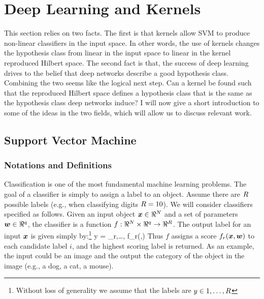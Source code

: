 \section{Deep Learning and Kernels}
This section relies on two facts.
The first is that kernels allow SVM to produce non-linear classifiers in the input space.
In other words, the use of kernels changes the hypothesis class from linear in the input space to linear in the kernel reproduced Hilbert space.
The second fact is that, the success of deep learning drives to the belief that deep networks describe a good hypothesis class.
Combining the two seems like the logical next step.
Can a kernel be found such that the reproduced Hilbert space defines a hypothesis class that is the same as the hypothesis class deep networks induce?
I will now give a short introduction to some of the ideas in the two fields, which will allow us to discuss relevant work.
\subsection{Support Vector Machine}
\subsubsection{Notations and Definitions}
Classification is one of the most fundamental machine learning problems. The goal of a classifier is simply to assign a label to an object. Assume there are $R$ possible labels (e.g., when classifying digits $R=10$). We will consider classifiers specified as follows. Given an input object $\boldsymbol{x} \in \Re^N$ and a set of parameters $\boldsymbol{w}\in\Re^q$, the classifier is a function $f: \Re^N \times \Re^q \to \Re^R$. The output label for an input $\boldsymbol{x}$ is given simply by:\footnote{Without loss of generality we assume that the labels are $y \in 1,\ldots,R$}
\be
y = \arg\max_{r,\ldots, \card} f_r(\xx,\ww)
\label{eq:argmax_classify}
\ee
Thus $f$ assigns a score $f_r(\boldsymbol{x},\boldsymbol{w})$ to each candidate label $i$, and the highest scoring label is returned.
As an example, the input could be an image and the output the category of the object in the image (e.g., a dog, a cat, a mouse). 


